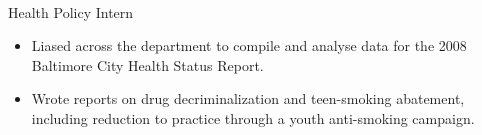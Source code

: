 \documentclass[margin]{res}
\begin{document}
\begin{sloppypar}
\begin{resume}
 \\
Health Policy Intern
\begin{itemize}
\item Liased across the department to compile and analyse data for the 2008 Baltimore City Health Status Report. 
\item Wrote reports on drug decriminalization and teen-smoking abatement, including reduction to practice through a youth anti-smoking campaign.
\end{itemize}






%
%
%



\end{resume}
\end{sloppypar}
\end{document}
